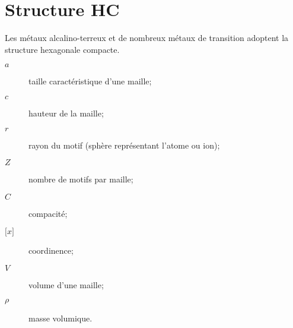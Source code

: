 \section{Structure HC}
Les métaux alcalino-terreux et de nombreux métaux de transition
adoptent la structure hexagonale compacte.
\begin{description}
    \item[$a$] taille caractéristique d'une maille;
    \item[$c$] hauteur de la maille;
    \item[$r$] rayon du motif (sphère représentant l'atome ou ion);
    \item[$Z$] nombre de motifs par maille;
    \item[$C$] compacité;
    \item[$\lbrack x \rbrack$] coordinence;
    \item[$V$] volume d'une maille;
    \item[$\rho$] masse volumique.
\end{description}
